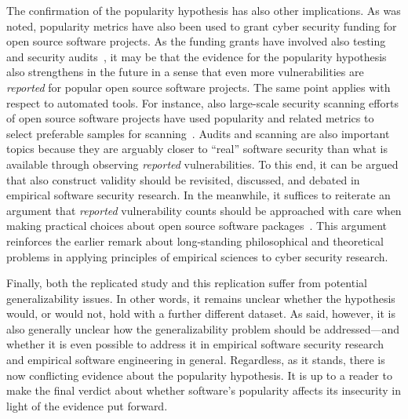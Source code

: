 \documentclass[5p, twocolumn, numbers, sort]{elsarticle}
\begin{document}
The confirmation of the popularity hypothesis has also other implications. As
was noted, popularity metrics have also been used to grant cyber security
funding for open source software projects. As the funding grants have involved
also testing and security audits~\cite{Ruohonen24JSS}, it may be that the
evidence for the popularity hypothesis also strengthens in the future in a sense
that even more vulnerabilities are \textit{reported} for popular open source
software projects. The same point applies with respect to automated tools. For
instance, also large-scale security scanning efforts of open source software
projects have used popularity and related metrics to select preferable samples
for scanning~\cite{AlphaOmega25}. Audits and scanning are also important topics
because they are arguably closer to ``real'' software security than what is
available through observing \textit{reported} vulnerabilities. To this end, it
can be argued that also construct validity should be revisited, discussed, and
debated in empirical software security research. In the meanwhile, it suffices
to reiterate an argument that \textit{reported} vulnerability counts should be
approached with care when making practical choices about open source software
packages~\cite{Ruohonen18IWESEP}. This argument reinforces the earlier remark
about long-standing philosophical and theoretical problems in applying
principles of empirical sciences to cyber security research.

Finally, both the replicated study and this replication suffer from potential
generalizability issues. In other words, it remains unclear whether the
hypothesis would, or would not, hold with a further different dataset. As said,
however, it is also generally unclear how the generalizability problem should be
addressed---and whether it is even possible to address it in empirical software
security research and empirical software engineering in general. Regardless, as
it stands, there is now conflicting evidence about the popularity hypothesis. It
is up to a reader to make the final verdict about whether software's popularity
affects its insecurity in light of the evidence put forward.

\balance

%
\end{document}
